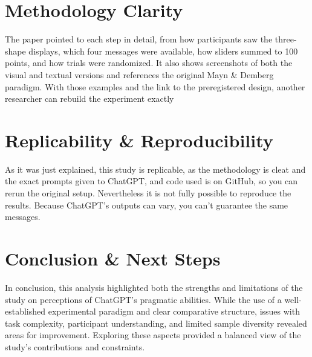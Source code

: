 \documentclass[12pt]{article}
\begin{document}
\section{Methodology Clarity}
The paper pointed to each step in detail, from how participants saw the three-shape displays, which four messages were available, how sliders summed to 100 points, and how trials were randomized. It also shows screenshots of both the visual and textual versions and references the original Mayn \& Demberg paradigm. With those examples and the link to the preregistered design, another researcher can rebuild the experiment exactly

\section{Replicability \& Reproducibility}
As it was just explained, this study is replicable, as the methodology is cleat and the exact prompts given to ChatGPT, and code used is on GitHub, so you can rerun the original setup. Nevertheless it is not fully possible to reproduce the results. Because ChatGPT’s outputs can vary, you can’t guarantee the same messages.


\section{Conclusion \& Next Steps}
In conclusion, this analysis highlighted both the strengths and limitations of the study on perceptions of ChatGPT’s pragmatic abilities. While the use of a well-established experimental paradigm and clear comparative structure, issues with task complexity, participant understanding, and limited sample diversity revealed areas for improvement. Exploring these aspects provided a balanced view of the study’s contributions and constraints.

 

\end{document}
